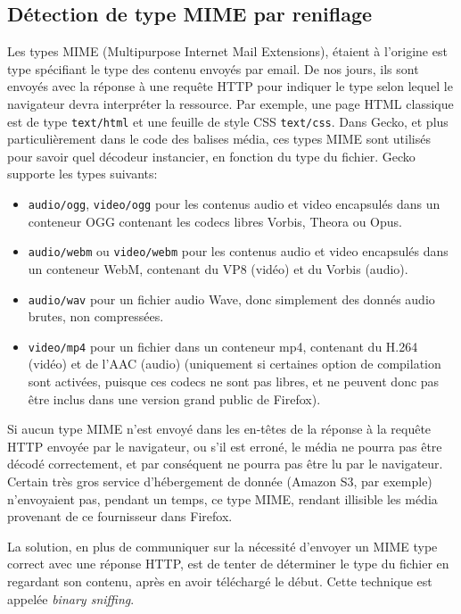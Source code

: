 \documentclass[a4paper,10pt]{article}
\newcommand{\cc}[1]{\texttt{#1}}
\begin{document}
\begin{multicols}{2}
  \section{Détection de type MIME par reniflage}
    Les types MIME (Multipurpose Internet Mail Extensions), étaient à l'origine
    est type spécifiant le type des contenu envoyés par email. De nos jours, ils
    sont envoyés avec la réponse à une requête HTTP pour indiquer le type selon
    lequel le navigateur devra interpréter la ressource. Par exemple, une page
    HTML classique est de type \cc{text/html} et une feuille de style CSS
    \cc{text/css}. Dans Gecko, et plus particulièrement dans le code des balises
    média, ces types MIME sont utilisés pour savoir quel décodeur instancier, en
    fonction du type du fichier. Gecko supporte les types suivants:

    \begin{itemize}
      \item \cc{audio/ogg}, \cc{video/ogg} pour les contenus audio et video
        encapsulés dans un conteneur OGG contenant les codecs libres Vorbis, Theora ou Opus.
      \item \cc{audio/webm} ou \cc{video/webm} pour les contenus audio et video
        encapsulés dans un conteneur WebM, contenant du VP8 (vidéo) et du Vorbis
        (audio).
      \item \cc{audio/wav} pour un fichier audio Wave, donc simplement des
        donnés audio brutes, non compressées.
      \item \cc{video/mp4} pour un fichier dans un conteneur mp4, contenant du
        H.264 (vidéo) et de l'AAC (audio) (uniquement si certaines option de compilation sont
        activées, puisque ces codecs ne sont pas libres, et ne peuvent donc pas
        être inclus dans une version grand public de Firefox).
    \end{itemize}

    Si aucun type MIME n'est envoyé dans les en-têtes de la réponse à la requête
    HTTP envoyée par le navigateur, ou s'il est erroné, le média ne pourra pas
    être décodé correctement, et par conséquent ne pourra pas être lu par le
    navigateur. Certain très gros service d'hébergement de donnée (Amazon S3,
    par exemple) n'envoyaient pas, pendant un temps, ce type MIME, rendant
    illisible les média provenant de ce fournisseur dans Firefox.

    La solution, en plus de communiquer sur la nécessité d'envoyer un MIME type
    correct avec une réponse HTTP, est de tenter de déterminer le type du
    fichier en regardant son contenu, après en avoir téléchargé le début. Cette
    technique est appelée \emph{binary sniffing}.


\end{multicols}
\end{document}
